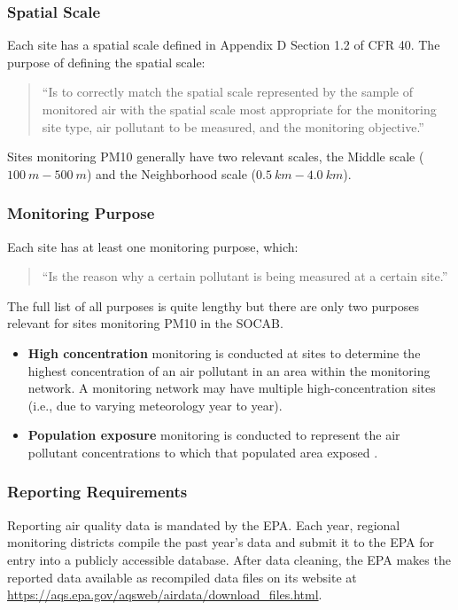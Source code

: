 \documentclass{article}
\begin{document}
	\subsubsection*{Spatial Scale}
	\label{subsubsec:spatscale}
	Each site has a spatial scale defined in Appendix D Section 1.2 of \ac{CFR} 40. The purpose of defining the spatial scale:
	\begin{quote}
		``Is to correctly match the spatial scale represented by the sample of monitored air with the spatial scale most appropriate for the monitoring site type, air pollutant to be measured, and the monitoring objective.''  \cite{CFR:Title40-58}
	\end{quote}
	Sites monitoring \ac{PM10} generally have two relevant scales, the Middle scale ($100~m - 500~m$) and the Neighborhood scale ($0.5~km - 4.0~km$).  
	
	\subsubsection*{Monitoring Purpose}
	\label{subsubsec:purpose}
	Each site has at least one monitoring purpose, which: 
	\begin{quote}
		``Is the reason why a certain pollutant is being measured at a certain site.'' \citep{AQMNP:2019} 
	\end{quote} The full list of all purposes 
	is quite lengthy
	but there are only two purposes relevant for sites monitoring \ac{PM10} in the \ac{SOCAB}.  
	\begin{itemize}
		\item \textbf{High concentration} monitoring is conducted at sites to determine the highest concentration of an air pollutant in an area within the monitoring network. A monitoring network may have multiple high-concentration sites (i.e., due to varying meteorology year to year).
		\item \textbf{Population exposure} monitoring is conducted to represent the air pollutant concentrations to which that populated area exposed 
		\citep{AQMNP:2019}.
	\end{itemize}
	
	
	\subsubsection*{Reporting Requirements}
	\label{subsubsec:ReportingRequirements}
	Reporting air quality data is mandated by the \ac{EPA}.  Each year, regional monitoring districts compile the past year's data and submit it to the \ac{EPA} for entry into a publicly accessible database.  After data cleaning, the \ac{EPA} makes the reported data available as recompiled data files on its website at \url{https://aqs.epa.gov/aqsweb/airdata/download_files.html}.  
	
\end{document}

